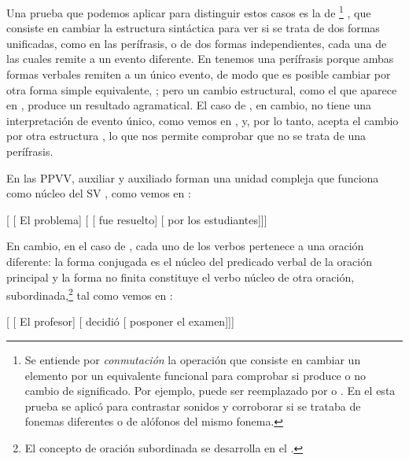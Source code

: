 Una prueba que podemos aplicar para distinguir estos casos es la de
\footnote{Se entiende por \textit{conmutación} la operación
que consiste en cambiar un elemento por un equivalente funcional para comprobar
si produce o no cambio de significado. Por ejemplo,  puede
ser reemplazado por  o . En el
 esta prueba se aplicó para contrastar sonidos y corroborar si se
trataba de fonemas diferentes o de alófonos del mismo fonema.}
, que consiste en cambiar la estructura sintáctica para ver
si se trata de dos formas unificadas, como en las perífrasis, o de dos formas
independientes, cada una de las cuales remite a un evento diferente. En
 tenemos una perífrasis porque ambas formas verbales
remiten a un único evento, de modo que es posible cambiar 
por otra forma simple equivalente,  ;
pero un cambio estructural, como el que aparece en ,
produce un resultado agramatical. El caso de , en cambio,
no tiene una interpretación de evento único, como vemos en
, y, por lo tanto, acepta el cambio por otra estructura
, lo que nos permite comprobar que no se trata de una
perífrasis.

En las PPVV, auxiliar y auxiliado forman una unidad compleja que funciona como
núcleo del SV , como vemos en :

\begin{exe}
  \ex\label{ex:11-de-pv} {}[ [ El problema] [
      [ fue resuelto] [ por los estudiantes]]]
\end{exe}

En cambio, en el caso de , cada uno de los verbos
pertenece a una oración diferente: la forma conjugada es el núcleo del predicado
verbal de la oración principal y la forma no finita constituye el verbo núcleo de
otra oración, subordinada,\footnote{El concepto de oración subordinada se
desarrolla en el .} tal como vemos en :

\begin{exe}
  \ex\label{ex:11-de-nopv} {}[ [ El profesor]
      [ decidió [ posponer el
      examen]]]
\end{exe}

